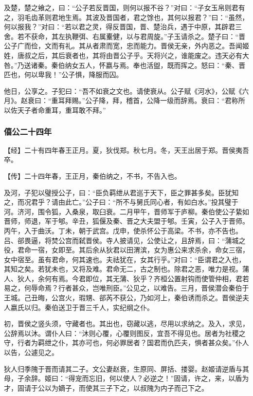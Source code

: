 \documentclass[]{article}
\begin{document}
及楚，楚之飨之，曰：``公子若反晋国，则何以报不谷？''对曰：``子女玉帛则君有之，羽毛齿革则君地生焉。其波及晋国者，君之馀也，其何以报君？''曰：``虽然，何以报我？''对曰：``若以君之灵，得反晋国，晋、楚治兵，遇于中原，其辟君三舍。若不获命，其左执鞭弭、右属櫜健，以与君周旋。''子玉请杀之。楚子曰：``晋公子广而俭，文而有礼。其从者肃而宽，忠而能力。晋侯无亲，外内恶之。吾闻姬姓，唐叔之后，其后衰者也，其将由晋公子乎。天将兴之，谁能废之。违天必有大咎。''乃送诸秦。秦伯纳女五人，怀嬴与焉。奉也活盥，既而挥之。怒曰：``秦、晋匹也，何以卑我！''公子惧，降服而囚。

他日，公享之。子犯曰：``吾不如衰之文也。请使衰从。公子赋《河水》，公赋《六月》。赵衰曰：``重耳拜赐。''公子降，拜，稽首，公降一级而辞焉。衰曰：``君称所以佐天子者命重耳，重耳敢不拜。''

\hypertarget{header-n912}{%
\subsubsection{僖公二十四年}\label{header-n912}}

【经】二十有四年春王正月。夏，狄伐郑。秋七月。冬，天王出居于郑。晋侯夷吾卒。

【传】二十四年春，王正月，秦伯纳之，不书，不告入也。

及河，子犯以璧授公子，曰：``臣负羁绁从君巡于天下，臣之罪甚多矣。臣犹知之，而况君乎？请由此亡。''公子曰：``所不与舅氏同心者，有如白水。''投其璧于河。济河，围令狐，入桑泉，取臼衰。二月甲午，晋师军于庐柳。秦伯使公子絷如晋师，师退，军于郇。辛丑，狐偃及秦、晋之大夫盟于郇。壬寅，公子入于晋师。丙午，入于曲沃。丁未，朝于武宫。戊申，使杀怀公于高梁。不书，亦不告也。吕、郤畏逼，将焚公宫而弑晋侯。寺人披请见，公使让之，且辞焉，曰：``蒲城之役，君命一宿，女即至。其后余从狄君以田渭滨，女为惠公来求杀余，命女三宿，女中宿至。虽有君命，何其速也。夫祛犹在，女其行乎。''对曰：``臣谓君之入也，其知之矣。若犹未也，又将及难。君命无二，古之制也。除君之恶，唯力是视。蒲人、狄人，余何有焉。今君即位，其无蒲、狄乎？齐桓公置射钩而使管仲相，君若易之，何辱命焉？行者甚众，岂唯刑臣。''公见之，以难告。三月，晋侯潜会秦伯于王城。己丑晦，公宫火，瑕甥、郤芮不获公，乃如河上，秦伯诱而杀之。晋侯逆夫人嬴氏以归。秦伯送卫于晋三千人，实纪纲之仆。

初，晋侯之竖头须，守藏者也。其出也，窃藏以逃，尽用以求纳之。及入，求见，公辞焉以沐。谓仆人曰：``沐则心覆，心覆则图反，宜吾不得见也。居者为社稷之守，行者为羁绁之仆，其亦可也，何必罪居者？国君而仇匹夫，惧者甚众矣。''仆人以告，公遽见之。

狄人归季隗于晋而请其二子。文公妻赵衰，生原同、屏括、搂婴。赵姬请逆盾与其母，子余辞。姬曰：``得宠而忘旧，何以使人？必逆之！''固请，许之，来，以盾为才，固请于公以为嫡子，而使其三子下之，以叔隗为内子而己下之。
\end{document}
